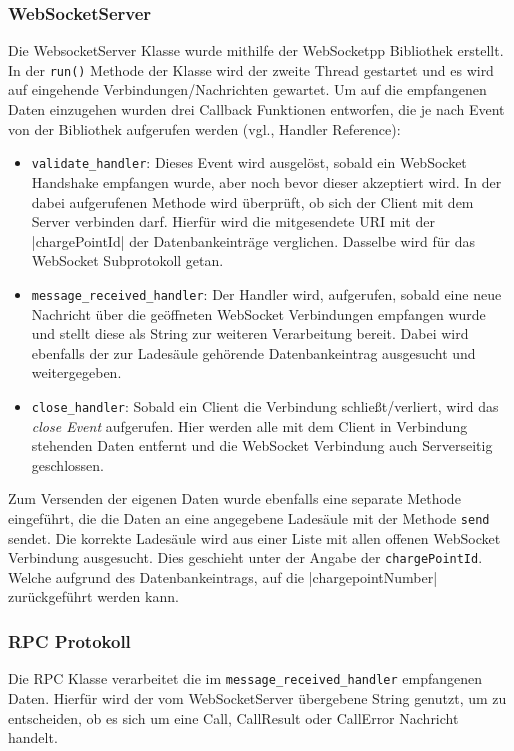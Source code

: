 \subsubsection{WebSocketServer}
Die WebsocketServer Klasse wurde mithilfe der WebSocketpp Bibliothek erstellt. In der \verb|run()| Methode der Klasse wird der zweite Thread gestartet und es wird auf eingehende Verbindungen/Nachrichten gewartet. Um auf die empfangenen Daten einzugehen wurden drei Callback Funktionen entworfen, die je nach Event von der Bibliothek aufgerufen werden (vgl.\cite{websocketpp_faq}, \glqq{}Handler Reference\grqq{}):
\begin{itemize}
	\item \verb|validate_handler|: Dieses Event wird ausgelöst, sobald ein WebSocket Handshake empfangen wurde, aber noch bevor dieser akzeptiert wird. In der dabei aufgerufenen Methode wird überprüft, ob sich der Client mit dem Server verbinden darf. Hierfür wird die mitgesendete \acs{URI} mit der \spverb|chargePointId| der Datenbankeinträge verglichen. Dasselbe wird für das WebSocket Subprotokoll getan.
	\item \verb|message_received_handler|: Der Handler wird, aufgerufen, sobald eine neue Nachricht über die geöffneten WebSocket Verbindungen empfangen wurde und stellt diese als String zur weiteren Verarbeitung bereit. Dabei wird ebenfalls der zur Ladesäule gehörende Datenbankeintrag ausgesucht und weitergegeben.
	\item \verb|close_handler|: Sobald ein Client die Verbindung schließt/verliert, wird das \textit{close Event} aufgerufen. Hier werden alle mit dem Client in Verbindung stehenden Daten entfernt und die WebSocket Verbindung auch Serverseitig geschlossen.
\end{itemize}

\noindent Zum Versenden der eigenen Daten wurde ebenfalls eine separate Methode eingeführt, die die Daten an eine angegebene Ladesäule mit der Methode \verb|send| sendet. Die korrekte Ladesäule wird aus einer Liste mit allen offenen WebSocket Verbindung ausgesucht. Dies geschieht unter der Angabe der \verb|chargePointId|. Welche aufgrund des Datenbankeintrags, auf die \spverb|chargepointNumber| zurückgeführt werden kann.

\subsubsection{RPC Protokoll}
Die RPC Klasse verarbeitet die im \verb|message_received_handler| empfangenen Daten. Hierfür wird der vom WebSocketServer übergebene String genutzt, um zu entscheiden, ob es sich um eine Call, CallResult oder CallError Nachricht handelt. \newline


